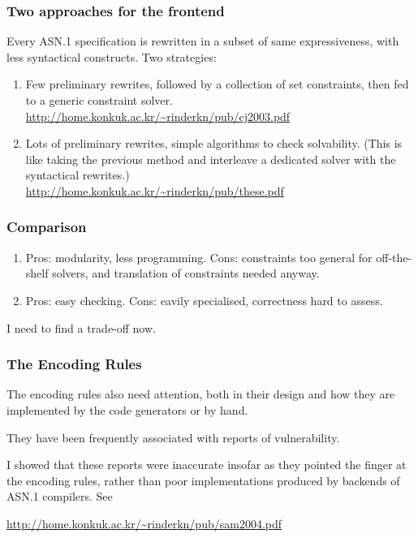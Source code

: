 \documentclass[compress,dvips,xcolor={dvipsnames},t]{beamer}
\newcommand\ASN{\textsf{ASN.1}\xspace}
\begin{document}

\begin{frame}
\frametitle{Two approaches for the frontend}

Every \ASN specification is rewritten in a subset of same
expressiveness, with less syntactical constructs. Two strategies:

\begin{enumerate}

  \item Few preliminary rewrites, followed by a collection of set
  constraints, then fed to a generic constraint solver.\\
{\small\url{http://home.konkuk.ac.kr/~rinderkn/pub/cj2003.pdf}}

\bigskip

  \item Lots of preliminary rewrites, simple algorithms to check
    solvability. (This is like taking the previous method and
    interleave a dedicated solver with the syntactical rewrites.)\\
{\small\url{http://home.konkuk.ac.kr/~rinderkn/pub/these.pdf}}

\end{enumerate}

\end{frame}


\begin{frame}
\frametitle{Comparison}

\begin{enumerate}

\item Pros: modularity, less programming. Cons: constraints too
  general for off-the-shelf solvers, and translation of constraints
  needed anyway.

\item Pros: easy checking. Cons: eavily specialised, correctness hard
  to assess.

\end{enumerate}
I need to find a trade-off now.

\end{frame}


\begin{frame}
\frametitle{The Encoding Rules}

The encoding rules also need attention, both in their design and how
they are implemented by the code generators or by hand.

\bigskip

They have been frequently associated with reports of vulnerability.

\bigskip

I showed that these reports were inaccurate insofar as they pointed
the finger at the encoding rules, rather than poor implementations
produced by backends of \ASN compilers. See

\medskip

{\small\url{http://home.konkuk.ac.kr/~rinderkn/pub/sam2004.pdf}}

\end{frame}
\end{document}
